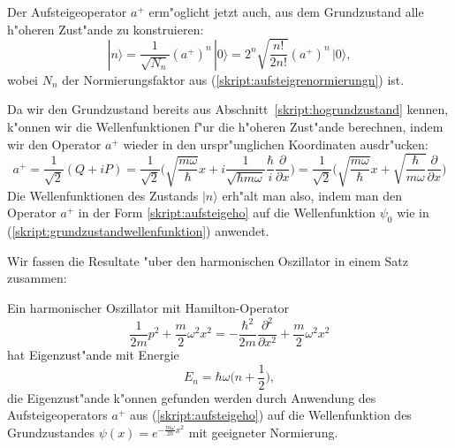 Der Aufsteigeoperator $a^+$ erm"oglicht jetzt auch, aus dem Grundzustand
alle h"oheren Zust"ande zu konstruieren:
\begin{equation}
|n\rangle
=
\frac{1}{\sqrt{N_n}}(a^+)^n\,|0\rangle
=
2^n \sqrt{\frac{n!}{2n!}} (a^+)^n\,|0\rangle,
\end{equation}
wobei $N_n$ der Normierungsfaktor aus (\ref{skript:aufsteigrenormierungn}) ist.

Da wir den Grundzustand bereits aus Abschnitt~\ref{skript:hogrundzustand} kennen,
k"onnen wir die Wellenfunktionen f"ur die h"oheren Zust"ande berechnen,
indem wir den Operator $a^+$ wieder in den urspr"unglichen Koordinaten
ausdr"ucken:
\begin{equation}
a^+=\frac1{\sqrt{2}}(Q+iP)
=
\frac1{\sqrt{2}}\biggl(
\sqrt{\frac{m\omega}{\hbar}}x
+i
\frac{1}{\sqrt{\hbar m\omega}}\frac{\hbar}{i}\frac{\partial}{\partial x}
\biggr)
=
\frac1{\sqrt{2}}
\biggl(
\sqrt{\frac{m\omega}{\hbar}}x
+
\sqrt{\frac{\hbar}{m\omega}}\frac{\partial}{\partial x}
\biggr)
\label{skript:aufsteigeho}
\end{equation}
Die Wellenfunktionen des Zustands $|n\rangle$ erh"alt man also, indem
man den Operator $a^+$ in der Form \ref{skript:aufsteigeho} auf die Wellenfunktion
$\psi_0$ wie in (\ref{skript:grundzustandwellenfunktion}) anwendet.

Wir fassen die Resultate "uber den harmonischen Oszillator in einem Satz
zusammen:
\begin{satz}
Ein harmonischer Oszillator mit Hamilton-Operator
\[
\frac{1}{2m}p^2+\frac{m}{2}\omega^2x^2
=
-\frac{\hbar^2}{2m}\frac{\partial^2}{\partial x^2}
+\frac{m}2\omega^2x^2
\]
hat Eigenzust"ande mit Energie
\begin{equation}
E_n
=
\hbar\omega\biggl(n+\frac12\biggr),
\label{skript:hoenergieniveaus}
\end{equation}
die Eigenzust"ande k"onnen gefunden werden durch Anwendung des
Aufsteigeoperators $a^+$
aus (\ref{skript:aufsteigeho}) auf die Wellenfunktion des Grundzustandes
$\psi(x)=e^{-\frac{m\omega}{2\hbar}x^2}$
mit geeigneter Normierung.
\end{satz}

